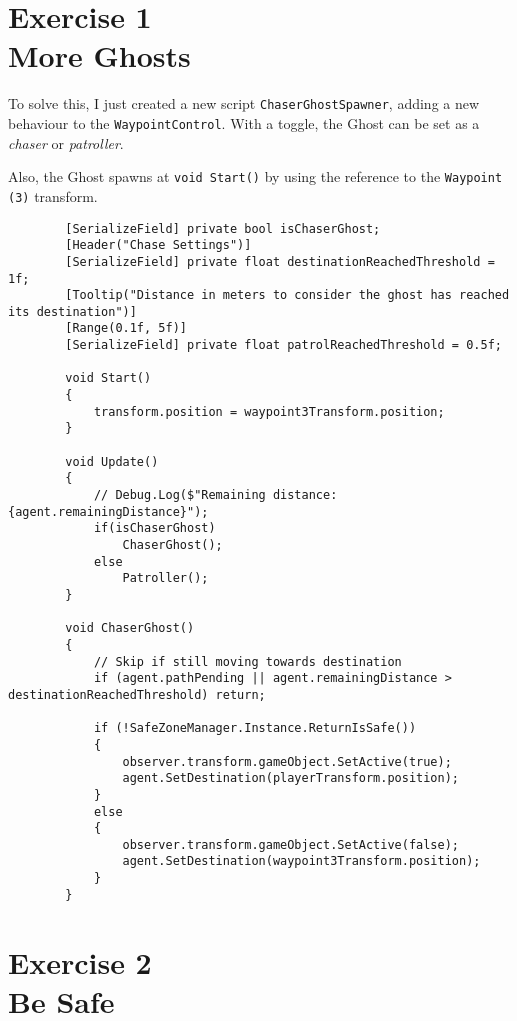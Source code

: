 \section[Exersice 1. More Ghosts]{Exercise 1\\ {\large More Ghosts}}

    To solve this, I just created a new script \texttt{ChaserGhostSpawner}, adding a new behaviour to the \texttt{WaypointControl}. With a toggle, the Ghost can be set as a \textit{chaser} or \textit{patroller}.

    Also, the Ghost spawns at  \texttt{void Start()} by using the reference to the \texttt{Waypoint (3)} transform.

    \begin{verbatim}
        [SerializeField] private bool isChaserGhost;
        [Header("Chase Settings")]
        [SerializeField] private float destinationReachedThreshold = 1f;
        [Tooltip("Distance in meters to consider the ghost has reached its destination")]
        [Range(0.1f, 5f)]
        [SerializeField] private float patrolReachedThreshold = 0.5f;

        void Start()
        {
            transform.position = waypoint3Transform.position;
        }

        void Update()
        {
            // Debug.Log($"Remaining distance: {agent.remainingDistance}");
            if(isChaserGhost)
                ChaserGhost();
            else
                Patroller();
        }

        void ChaserGhost()
        {
            // Skip if still moving towards destination
            if (agent.pathPending || agent.remainingDistance > destinationReachedThreshold) return;

            if (!SafeZoneManager.Instance.ReturnIsSafe())
            {
                observer.transform.gameObject.SetActive(true);
                agent.SetDestination(playerTransform.position);
            }
            else
            {
                observer.transform.gameObject.SetActive(false);
                agent.SetDestination(waypoint3Transform.position);
            }
        }
    \end{verbatim}

\section[Exersice 2. Be Safe]{Exercise 2\\ {\large Be Safe}}

